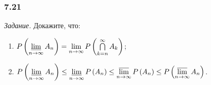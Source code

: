 \subsubsection*{7.21}

\textit{Задание.} Докажите, что:
\begin{enumerate}[label=\alph*)]
\item
$P \left( \varliminf \limits_{n \rightarrow \infty } A_n \right) =
\lim \limits_{n \rightarrow \infty } P \left( \bigcap \limits_{k=n}^{ \infty } A_k \right) $;
\item
$P \left( \varliminf \limits_{n \rightarrow \infty } A_n \right) \leq
\varliminf \limits_{n \rightarrow \infty } P \left( A_n \right) \leq
\varlimsup \limits_{n \rightarrow \infty } P \left( A_n \right) \leq
P \left( \varlimsup \limits_{n \rightarrow \infty } A_n \right) $.
\end{enumerate}


